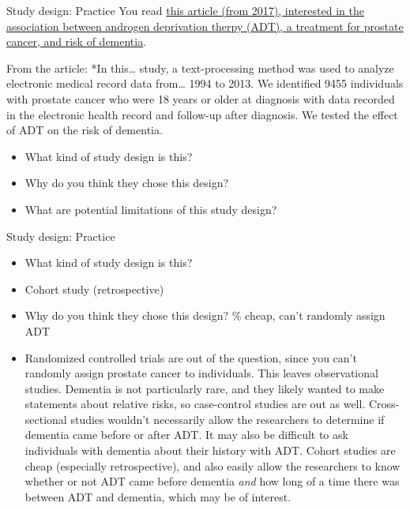 \documentclass[
  ignorenonframetext,
]{beamer}
\providecommand{\tightlist}{%
  \setlength{\itemsep}{0pt}\setlength{\parskip}{0pt}}
\begin{document}
\begin{frame}{Study design: Practice}
\protect\hypertarget{study-design-practice}{}
You read
\href{https://jamanetwork.com/journals/jamaoncology/fullarticle/2569059?resultClick=24}{this
article (from 2017), interested in the association between androgen
deprivation therpy (ADT), a treatment for prostate cancer, and risk of
dementia}.

From the article: *In this\ldots{} study, a text-processing method was
used to analyze electronic medical record data from\ldots{} 1994 to
2013. We identified 9455 individuals with prostate cancer who were 18
years or older at diagnosis with data recorded in the electronic health
record and follow-up after diagnosis. We tested the effect of ADT on the
risk of dementia.

\begin{itemize}
\tightlist
\item
  What kind of study design is this?
\item
  Why do you think they chose this design?
\item
  What are potential limitations of this study design?
\end{itemize}
\end{frame}

\begin{frame}{Study design: Practice}
\protect\hypertarget{study-design-practice-1}{}
\begin{itemize}
\item
  What kind of study design is this?
\item
  {Cohort study (retrospective)}
\item
  Why do you think they chose this design? \% cheap, can't randomly
  assign ADT
\item
  { Randomized controlled trials are out of the question, since you
  can't randomly assign prostate cancer to individuals. This leaves
  observational studies. Dementia is not particularly rare, and they
  likely wanted to make statements about relative risks, so case-control
  studies are out as well. Cross-sectional studies wouldn't necessarily
  allow the researchers to determine if dementia came before or after
  ADT. It may also be difficult to ask individuals with dementia about
  their history with ADT. Cohort studies are cheap (especially
  retrospective), and also easily allow the researchers to know whether
  or not ADT came before dementia \emph{and} how long of a time there
  was between ADT and dementia, which may be of interest.}
\end{itemize}
\end{frame}
\end{document}
